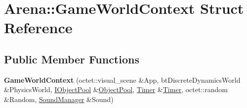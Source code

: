 \hypertarget{struct_arena_1_1_game_world_context}{\section{Arena\+:\+:Game\+World\+Context Struct Reference}
\label{struct_arena_1_1_game_world_context}
}
\subsection*{Public Member Functions}
\begin{DoxyCompactItemize}
\item 
\hypertarget{struct_arena_1_1_game_world_context_ac536eecda8382016f3bcd23e27a9af4c}{{\bfseries Game\+World\+Context} (octet\+::visual\+\_\+scene \&App, bt\+Discrete\+Dynamics\+World \&Physics\+World, \hyperlink{class_arena_1_1_i_object_pool}{I\+Object\+Pool} \&\hyperlink{class_arena_1_1_object_pool}{Object\+Pool}, \hyperlink{class_timer}{Timer} \&\hyperlink{class_timer}{Timer}, octet\+::random \&Random, \hyperlink{class_arena_1_1_sound_manager}{Sound\+Manager} \&Sound)}\label{struct_arena_1_1_game_world_context_ac536eecda8382016f3bcd23e27a9af4c}

\end{DoxyCompactItemize}
